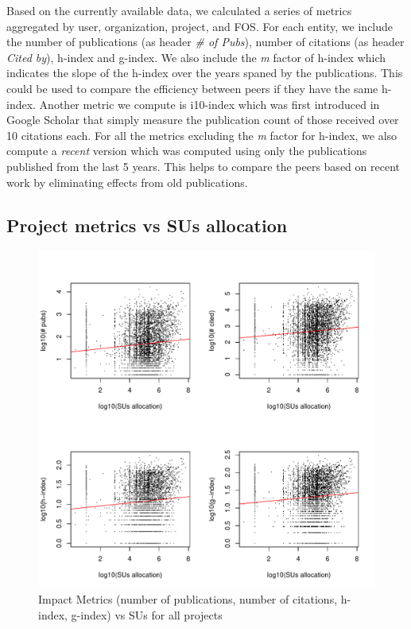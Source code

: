 \documentclass{sig-alternate}
\begin{document}
Based on the currently available data, we calculated a series of metrics aggregated by user, organization, project, and FOS.  For each entity, we include the number of publications (as header \emph{\# of Pubs}), number of citations (as header \emph{Cited by}), h-index and g-index. We also include the \emph{m} factor of h-index which indicates the slope of the h-index over the years spaned by the publications. This could be used to compare the efficiency between peers if they have the same h-index. Another metric we compute is i10-index \cite{www-i10index} which was first introduced in Google Scholar that simply measure the publication count of those received over 10 citations each. For all the metrics excluding the \emph{m} factor for h-index, we also compute a \emph{recent} version which was computed using only the publications published from the last 5 years. This helps to compare the peers based on recent work by eliminating effects from old publications.

\subsection{Project metrics vs SUs allocation} 
 
\begin{figure}[!htb] 
  \centering 
    \includegraphics[width=1.0\columnwidth]{images/02_metrics_vs_alloc_proj.pdf} 
  \caption{Impact Metrics (number of publications, number of citations, h-index, g-index) vs SUs for all projects}\label{F:metrics-vs-alloc-proj} 
\end{figure} 
 
\end{document}
